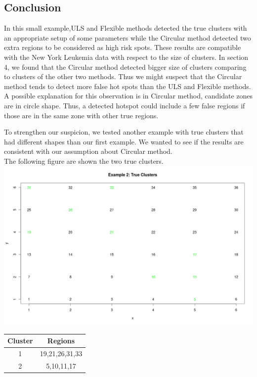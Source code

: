 \documentclass[12pt]{article}
\begin{document}
\subsection{Conclusion}

In this small example,ULS and Flexible methods detected the true clusters with an appropriate setup of some parameters while the Circular method detected two extra regions to be considered as high risk spots. These results are compatible with the New York Leukemia data with respect to the size of clusters. In section 4, we found that the Circular method detected bigger size of clusters comparing to clusters of the other two methods. Thus we might suspect that the Circular method tends to detect more false hot spots than the ULS and Flexible methods. A possible explanation for this observation is in Circular method, candidate zones are in circle shape. Thus, a detected hotspot could include a few false regions if those are in the same zone with other true regions.  

To strengthen our suspicion, we tested another example with true clusters that had different shapes than our first example. We wanted to see if the results are consistent with our assumption about Circular method.\\ 
The following figure are shown the two true clusters.\\
\includegraphics[scale=0.2]{ex2_true}\\

\hspace{4cm}\begin{tabular}{|c|c|}
	\hline
	Cluster & Regions \\
	\hline
	1 & 19,21,26,31,33 \\
	2 & 5,10,11,17 \\ \hline
\end{tabular} \\
\end{document}
